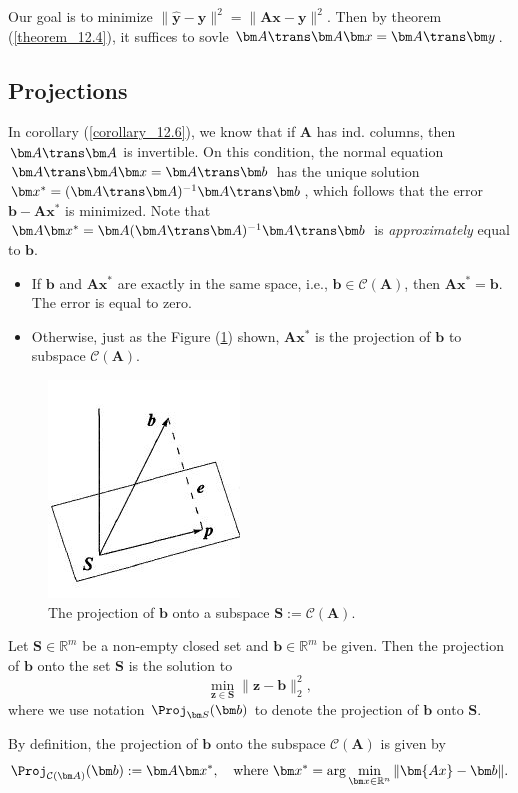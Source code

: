 Our goal is to minimize $\|\hat{\bm y}-\bm y\|^2=\|\bm{Ax}-\bm y\|^2$. Then by theorem (\ref{theorem_12.4}), it suffices to sovle $\bm A\trans\bm A\bm x=\bm A\trans\bm y$.

\subsection{Projections}
In corollary (\ref{corollary_12.6}), we know that if $\bm A$ has ind. columns, then $\bm A\trans\bm A$ is invertible. On this condition, the normal equation $\bm A\trans\bm A\bm x=\bm A\trans\bm b$ has the unique solution $\bm x^{*}=(\bm A\trans\bm A)^{-1}\bm A\trans\bm b$, which follows that the error $\bm b-\bm A\bm x^{*}$ is minimized. Note that $\bm A\bm x^{*}=\bm A(\bm A\trans\bm A)^{-1}\bm A\trans\bm b$ is \emph{approximately} equal to $\bm b$. 
\begin{itemize}
\item
If $\bm b$ and $\bm{A}\bm x^{*}$ are exactly in the same space, i.e., $\bm b\in\mathcal{C}(\bm A)$, then $\bm{A}\bm x^{*}=\bm b$. The error is equal to zero.
\item
Otherwise, just as the Figure (\ref{figure_12.2}) shown, $\bm A\bm x^{*}$ is the projection of $\bm b$ to subspace $\mathcal{C}(\bm A)$.
\end{itemize}
\begin{figure}[t]
\centering
\includegraphics{week5/projection}
\caption{The projection of $\bm b$ onto a subspace $\bm S:=\mathcal{C}(\bm A)$.}\label{figure_12.2}
\end{figure}
\begin{definition}[Projection]
Let $\bm S\in\mathbb{R}^{m}$ be a non-empty closed set and $\bm b\in\mathbb{R}^m$ be given. Then the projection of $\bm b$ onto the set $\bm S$ is the solution to
\[
\min_{\bm z\in\bm S}\|\bm z-\bm b\|_2^2,
\]
where we use notation $\Proj_{\bm S}(\bm b)$ to denote the projection of $\bm b$ onto $\bm S$.
\end{definition}
By definition, the projection of $\bm b$ onto the subspace $\mathcal{C}(\bm A)$ is given by 
\[
\Proj_{\mathcal{C}(\bm A)}(\bm b):=\bm A\bm x^*,\quad
\text{where }\bm x^*=\arg\min_{\bm x\in\mathbb{R}^n}\|\bm{Ax} - \bm b\|.
\]

